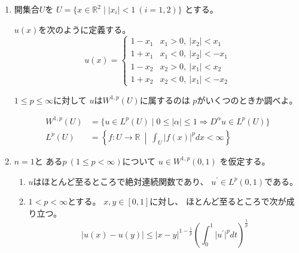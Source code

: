 \documentclass[12pt,b5paper]{ltjsarticle}
\begin{document}
\begin{enumerate}
      \dotfill


      \hrulefill
 \item
      開集合$U$を
      $U=\{ x \in \mathbb{R}^{2} \mid \lvert x_{i} \rvert <1 \: (i=1,2) \}$
      とする。

      $u(x)$を次のように定義する。
      \begin{equation}
       u(x)=
        \begin{cases}
         1-x_{1} & x_{1}>0 ,\: \lvert x_{2} \rvert < x_{1}\\
         1+x_{1} & x_{1}<0 ,\: \lvert x_{2} \rvert < -x_{1}\\
         1-x_{2} & x_{2}>0 ,\: \lvert x_{1} \rvert < x_{2}\\
         1+x_{2} & x_{2}<0 ,\: \lvert x_{1} \rvert < -x_{2}
        \end{cases}
      \end{equation}

      $1\leq p \leq \infty$に対して
      $u$は$W^{1,p}(U)$に属するのは
      $p$がいくつのときか調べよ。

      \dotfill


      \begin{align}
       W^{1,p}(U) &= \{ u\in L^{p}(U) \mid 0\leq \lvert \alpha \rvert \leq 1 \Rightarrow D^{\alpha}u \in L^{p}(U) \}\\
       L^{p}(U) &= \left\{ f:U\to \mathbb{R} \:\middle|\: \int_{U}\lvert f(x) \rvert^{p}dx < \infty  \right\}
      \end{align}

      \hrulefill
 \item
      $n=1$と
      ある$p \: (1\leq p < \infty)$について
      $u\in W^{1,p}(0,1)$
      を仮定する。

      \begin{enumerate}
       \item
            $u$はほとんど至るところで絶対連続関数であり、
            $u^{\prime}\in L^{p}(0,1)$である。

            \dotfill


            \hrulefill

       \item
            $1< p < \infty$とする。
            $x,y\in [0,1]$に対し、
            ほとんど至るところで次が成り立つ。
            \begin{equation}
             \lvert u(x) - u(y) \rvert
              \leq
              \lvert x-y \rvert^{1-\frac{1}{p}}
              \left( \int_{0}^{1}\lvert u^{\prime}\rvert^{p}dt \right)^{\frac{1}{p}}
            \end{equation}



\end{enumerate}
\end{enumerate}
\end{document}

